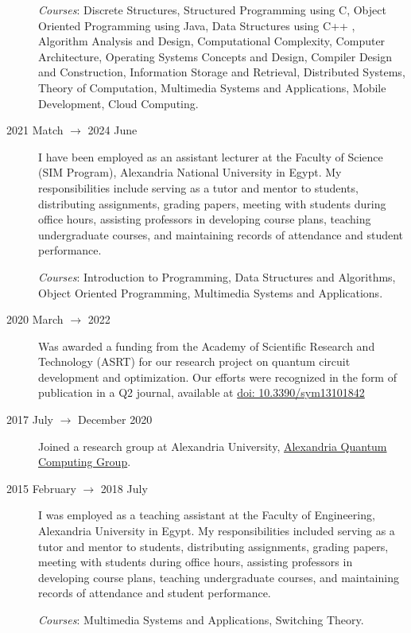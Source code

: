 \documentclass[margin,line]{resume}
\newcommand*{\doi}[1]{\href{http://dx.doi.org/#1}{doi: #1}}
\begin{document}
\begin{resume}
\begin{description}
			\emph{Courses}: Discrete Structures, Structured Programming using C, Object Oriented Programming using Java, Data Structures using C++ , Algorithm Analysis and Design, Computational Complexity, Computer Architecture, Operating Systems Concepts and Design, Compiler Design and Construction, Information Storage and Retrieval, Distributed Systems, Theory of Computation, Multimedia Systems and Applications, Mobile Development, Cloud Computing.

		\item[2021 Match $\rightarrow$ 2024 June] I have been employed as an assistant lecturer at the Faculty of Science (SIM Program), Alexandria National University in Egypt. My responsibilities include serving as a tutor and mentor to students, distributing assignments, grading papers, meeting with students during office hours, assisting professors in developing course plans, teaching undergraduate courses, and maintaining records of attendance and student performance.

			\emph{Courses}: Introduction to Programming, Data Structures and Algorithms, Object Oriented Programming, Multimedia Systems and Applications.

		
		\item[2020 March $\rightarrow$ 2022] Was awarded a funding from the Academy of Scientific Research and Technology (ASRT) for our research project on quantum circuit development and optimization. Our efforts were recognized in the form of publication in a Q2 journal, available at \doi{10.3390/sym13101842}
		
			\item[2017 July $\rightarrow$ December 2020 ]  Joined a research group at Alexandria University, \href{http://www.sci.p.alexu.edu.eg/~aleqcg/index.html}{Alexandria Quantum Computing Group}.




		\item[2015 February $\rightarrow$ 2018 July]  I was employed as a teaching assistant at the Faculty of Engineering, Alexandria University in Egypt. My responsibilities included serving as a tutor and mentor to students, distributing assignments, grading papers, meeting with students during office hours, assisting professors in developing course plans, teaching undergraduate courses, and maintaining records of attendance and student performance.

			\emph{Courses}: Multimedia Systems and Applications, Switching Theory.

	\end{description}




\end{resume}
\end{document}
